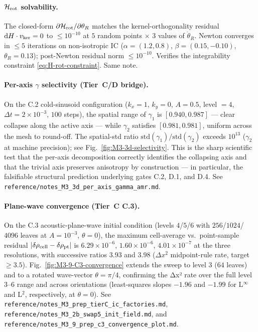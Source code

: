 \documentclass[11pt]{article}
\begin{document}
\paragraph{$\mathcal H_{\rm rot}$ solvability.} The closed-form
$\partial \mathcal H_{\rm rot}/\partial \theta_R$ matches the
kernel-orthogonality residual $\mathrm dH \cdot v_{\rm ker} = 0$
to $\le 10^{-10}$ at $5$ random points $\times$ $3$ values of
$\dot\theta_R$. Newton converges in $\le 5$ iterations on
non-isotropic IC ($\alpha = (1.2, 0.8)$, $\beta = (0.15, -0.10)$,
$\theta_R = 0.13$); post-Newton residual norm $\le 10^{-10}$.
Verifies the integrability constraint
\eqref{eq:H-rot-constraint}. Same note.

\paragraph{Per-axis $\gamma$ selectivity (Tier~C/D bridge).}
On the C.2 cold-sinusoid configuration ($k_x = 1$, $k_y = 0$,
$A = 0.5$, level $= 4$, $\Delta t = 2\times 10^{-3}$, $100$
steps), the spatial range of $\gamma_1$ is $[0.940, 0.987]$ ---
clear collapse along the active axis --- while $\gamma_2$
satisfies $[0.981, 0.981]$, uniform across the mesh to
round-off. The spatial-std ratio
$\mathrm{std}(\gamma_1)/\mathrm{std}(\gamma_2)$ exceeds
$10^{13}$ ($\gamma_2$ at machine precision); see
Fig.~\ref{fig:M3-3d-selectivity}. This is the sharp scientific
test that the per-axis decomposition correctly identifies the
collapsing axis and that the trivial axis preserves anisotropy
by construction --- in particular, the falsifiable structural
prediction underlying gates C.2, D.1, and D.4. See
\verb|reference/notes_M3_3d_per_axis_gamma_amr.md|.

\paragraph{Plane-wave convergence (Tier~C C.3).} On the C.3
acoustic-plane-wave initial condition (levels $4$/$5$/$6$ with
$256$/$1024$/$4096$ leaves at $A = 10^{-3}$, $\theta = 0$), the
maximum cell-average vs.\ point-sample residual
$|\delta\rho_{\rm cell} - \delta\rho_{\rm pt}|$ is $6.29\times
10^{-6}$, $1.60\times 10^{-6}$, $4.01\times 10^{-7}$ at the
three resolutions, with successive ratios $3.93$ and $3.98$
($\Delta x^2$ midpoint-rule rate, target $\ge 3.5$).
Fig.~\ref{fig:M3-9-C3-convergence} extends the sweep to level
$3$ ($64$ leaves) and to a rotated wave-vector $\theta = \pi/4$,
confirming the Δx² rate over the full level $3$--$6$ range and
across orientations (least-squares slopes
$-1.96$ and $-1.99$ for L${}^\infty$ and L${}^2$, respectively,
at $\theta = 0$). See
\verb|reference/notes_M3_prep_tierC_ic_factories.md|,
\verb|reference/notes_M3_2b_swap5_init_field.md|, and
\verb|reference/notes_M3_9_prep_c3_convergence_plot.md|.
\end{document}
